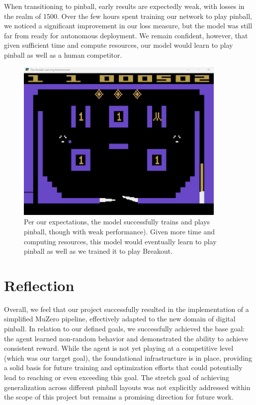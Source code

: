 \documentclass{article}
\begin{document}
When transitioning to pinball, early results are expectedly weak, with losses in the realm of 1500. Over the few hours spent training our network to play pinball, we noticed a significant improvement in our loss measure, but the model was still far from ready for autonomous deployment. We remain confident, however, that given sufficient time and compute resources, our model would learn to play pinball as well as a human competitor.

\begin{figure}[H]
    \centering
    \includegraphics[width=0.9\textwidth]{pinball_gameplay.jpeg}
    \caption{Per our expectations, the model successfully trains and plays pinball, though with weak performance). Given more time and computing resources, this model would eventually learn to play pinball as well as we trained it to play Breakout.}
    \label{fig:pinball_gameplay}
\end{figure}

\section{Reflection}
Overall, we feel that our project successfully resulted in the implementation of a simplified MuZero pipeline, effectively adapted to the new domain of digital pinball. In relation to our defined goals, we successfully achieved the base goal: the agent learned non-random behavior and demonstrated the ability to achieve consistent reward. While the agent is not yet playing at a competitive level (which was our target goal), the foundational infrastructure is in place, providing a solid basis for future training and optimization efforts that could potentially lead to reaching or even exceeding this goal. The stretch goal of achieving generalization across different pinball layouts was not explicitly addressed within the scope of this project but remains a promising direction for future work.
\end{document}
